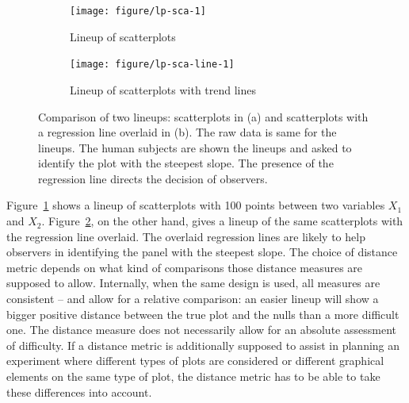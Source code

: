 \documentclass[12pt]{article}\usepackage[]{graphicx}\usepackage[]{color}
\newenvironment{knitrout}{}{} %
\begin{document}
\begin{figure}[hbtp]
\centering

\hfill
\begin{subfigure}[t]{0.45\textwidth}
\caption{\label{sca:type_1}Lineup of scatterplots}
\begin{knitrout}
\color{fgcolor}
\texttt{[image: figure/lp-sca-1]} 

\end{knitrout}
\end{subfigure}
\hfill
\begin{subfigure}[t]{0.45\textwidth}
\caption{\label{sca:type_2}Lineup of scatterplots with trend lines}
\begin{knitrout}
\color{fgcolor}
\texttt{[image: figure/lp-sca-line-1]} 

\end{knitrout}
\end{subfigure}
\hfill
	\vspace{-.1in}
\caption{\label{fig:sca}Comparison of two lineups: scatterplots in (a) and scatterplots with a regression line overlaid in (b). The raw data is same for the lineups. The human subjects are shown the lineups and asked to identify the plot with the steepest slope. The presence of the regression line directs the decision of observers.}
\label{plottype}
\end{figure}

Figure~\ref{sca:type_1} shows a lineup of scatterplots with 100 points between two variables $X_1$ and $X_2$. Figure~\ref{sca:type_2}, on the other hand, gives a lineup of the same scatterplots with the regression line overlaid. The overlaid regression lines are likely to help observers in identifying the panel with the steepest slope.
The choice of distance metric depends on what kind of comparisons those distance measures are supposed to allow. Internally, when the same design is used, all measures are consistent -- and allow for a relative comparison: an easier lineup will show a bigger positive distance between the true plot and the nulls than a more difficult one. The distance measure does not necessarily allow for an absolute assessment of difficulty. 
If a distance metric is additionally supposed to assist in planning an experiment where different types of plots are considered or different graphical elements on the same type of plot, the distance metric has to be able to take these differences into account. 
\end{document}
